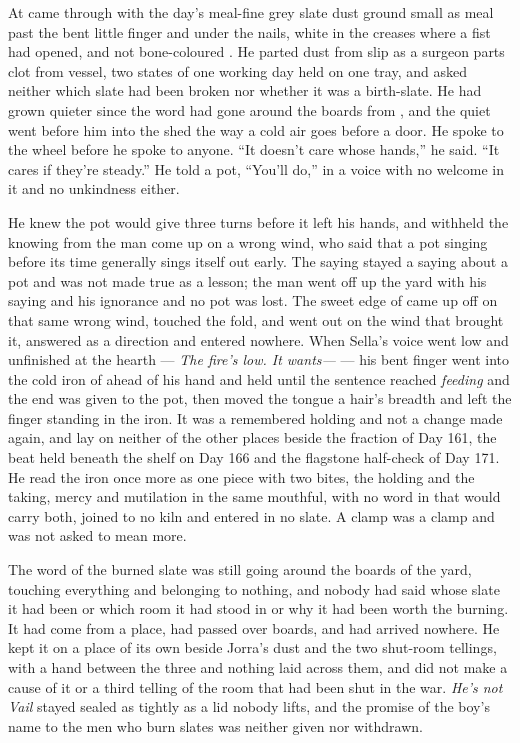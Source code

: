 \scenebreak

At   came through with the day's meal-fine grey slate dust ground small as meal past the bent little finger and under the nails, white in the creases where a fist had opened, and not bone-coloured . He parted dust from slip as a surgeon parts clot from vessel, two states of one working day held on one tray, and asked neither which slate had been broken nor whether it was a birth-slate. He had grown quieter since the word had gone around the boards from , and the quiet went before him into the shed the way a cold air goes before a door. He spoke to the wheel before he spoke to anyone. “It doesn't care whose hands,” he said. “It cares if they're steady.” He told a pot, “You'll do,” in a voice with no welcome in it and no unkindness either.

He knew  the pot would give three turns before it left his hands, and withheld the knowing from the man come up on a wrong wind, who said that a pot singing before its time generally sings itself out early. The saying stayed a saying about a pot and was not made true as a lesson; the man went off up the yard with his saying and his ignorance and no pot was lost. The sweet edge of  came up off  on that same wrong wind, touched the fold, and went out on the wind that brought it, answered as a direction and entered nowhere. When Sella's voice went low and unfinished at the hearth --- \emph{The fire's low. It wants---} --- his bent finger went into the cold iron of  ahead of his hand and held until the sentence reached \emph{feeding} and the end was given to the pot, then moved the tongue a hair's breadth and left the finger standing in the iron. It was a remembered holding and not a change made again, and lay on neither of the other places beside the fraction of Day 161, the beat held beneath the shelf on Day 166 and the flagstone half-check of Day 171. He read the iron once more as one piece with two bites, the holding and the taking, mercy and mutilation in the same mouthful, with no word in  that would carry both, joined to no kiln and entered in no slate. A clamp was a clamp and was not asked to mean more.

The word of the burned slate was still going around the boards of the yard, touching everything and belonging to nothing, and nobody had said whose slate it had been or which room it had stood in or why it had been worth the burning. It had come from a place, had passed over boards, and had arrived nowhere. He kept it on a place of its own beside Jorra's dust and the two shut-room tellings, with a hand between the three and nothing laid across them, and did not make a cause of it or a third telling of the room that had been shut in the war. \emph{He's not Vail} stayed sealed as tightly as a lid nobody lifts, and the promise of the boy's name to the men who burn slates was neither given nor withdrawn.

